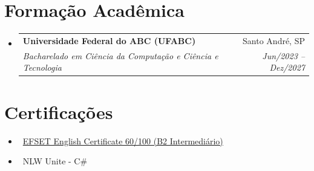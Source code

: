 \documentclass[letterpaper,10pt]{article}
\makeatletter
\newcommand{\resumeItem}[1]{\item\small{#1}}
\newcommand{\resumeSubheading}[4]{
  \vspace{-1pt}\item
  \begin{tabular*}{0.97\textwidth}[t]{l@{\extracolsep{\fill}}r}
    \textbf{#1} & #2 \\
    \textit{#3} & \textit{#4} \\
  \end{tabular*}\vspace{-7pt}
}
\newcommand{\resumeSubHeadingList}{\begin{itemize}[leftmargin=0.15in, label={}]}
\newcommand{\resumeSubHeadingListEnd}{\end{itemize}}
\makeatother
\begin{document}
\section{Formação Acadêmica}
\resumeSubHeadingList
  \resumeSubheading
    {Universidade Federal do ABC (UFABC)}{Santo André, SP}
    {Bacharelado em Ciência da Computação e Ciência e Tecnologia}{Jun/2023 -- Dez/2027}
\resumeSubHeadingListEnd

\section{Certificações}
\resumeSubHeadingList
  \resumeItem{\textbullet\ \href{https://efset.org/cert/9uJjv8}{EFSET English Certificate 60/100 (B2 Intermediário)}}
  \resumeItem{\textbullet\ NLW Unite - C\#}
\resumeSubHeadingListEnd
\end{document}
